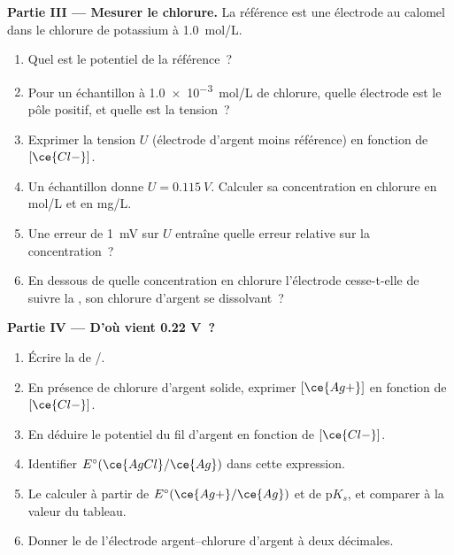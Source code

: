 \begin{problem}
\medskip
\noindent\textbf{Partie III --- Mesurer le chlorure.}
La référence est une électrode au calomel dans le chlorure de potassium
à \qty{1.0}{mol/L}.
\begin{enumerate}[resume]
  \item Quel est le potentiel de la référence~?
  \item Pour un échantillon à \qty{1.0e-3}{mol/L} de chlorure, quelle
        électrode est le pôle positif, et quelle est la tension~?
  \item Exprimer la tension $U$ (électrode d'argent moins référence) en
        fonction de $[\ce{Cl-}]$.
  \item Un échantillon donne $U = \qty{0.115}{V}$. Calculer sa
        concentration en chlorure en \unit{mol/L} et en \unit{mg/L}.
  \item Une erreur de \qty{1}{mV} sur $U$ entraîne quelle erreur
        relative sur la concentration~?
  \item En dessous de quelle concentration en chlorure l'électrode
        cesse-t-elle de suivre la , son chlorure
        d'argent se dissolvant~?
\end{enumerate}

\medskip
\noindent\textbf{Partie IV --- D'où vient 0.22 V~?}
\begin{enumerate}[resume]
  \item Écrire la  de /.
  \item En présence de chlorure d'argent solide, exprimer $[\ce{Ag+}]$
        en fonction de $[\ce{Cl-}]$.
  \item En déduire le potentiel du fil d'argent en fonction de
        $[\ce{Cl-}]$.
  \item Identifier $E^\circ(\ce{AgCl}/\ce{Ag})$ dans cette expression.
  \item Le calculer à partir de $E^\circ(\ce{Ag+}/\ce{Ag})$ et de
        $\mathrm{p}K_s$, et comparer à la valeur du tableau.
  \item Donner le  de l'électrode argent--chlorure
        d'argent à deux décimales.
\end{enumerate}
\end{problem}
